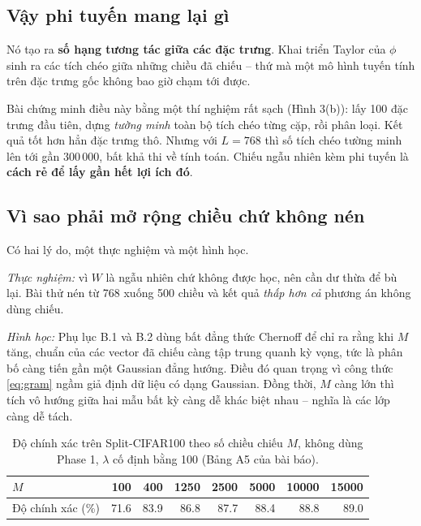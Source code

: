 \documentclass[11pt,a4paper]{article}
\begin{document}
\subsection{Vậy phi tuyến mang lại gì}

Nó tạo ra \textbf{số hạng tương tác giữa các đặc trưng}. Khai triển Taylor của
$\phi$ sinh ra các tích chéo giữa những chiều đã chiếu -- thứ mà một mô hình
tuyến tính trên đặc trưng gốc không bao giờ chạm tới được.

Bài chứng minh điều này bằng một thí nghiệm rất sạch (Hình 3(b)): lấy 100 đặc
trưng đầu tiên, dựng \emph{tường minh} toàn bộ tích chéo từng cặp, rồi phân loại.
Kết quả tốt hơn hẳn đặc trưng thô. Nhưng với $L = 768$ thì số tích chéo tường
minh lên tới gần $300\,000$, bất khả thi về tính toán. Chiếu ngẫu nhiên kèm phi
tuyến là \textbf{cách rẻ để lấy gần hết lợi ích đó}.

\subsection{Vì sao phải mở rộng chiều chứ không nén}

Có hai lý do, một thực nghiệm và một hình học.

\emph{Thực nghiệm:} vì $W$ là ngẫu nhiên chứ không được học, nên cần dư thừa để
bù lại. Bài thử nén từ 768 xuống 500 chiều và kết quả \emph{thấp hơn cả} phương
án không dùng chiếu.

\emph{Hình học:} Phụ lục B.1 và B.2 dùng bất đẳng thức Chernoff để chỉ ra rằng
khi $M$ tăng, chuẩn của các vector đã chiếu càng tập trung quanh kỳ vọng, tức là
phân bố càng tiến gần một Gaussian đẳng hướng. Điều đó quan trọng vì công thức
\eqref{eq:gram} ngầm giả định dữ liệu có dạng Gaussian. Đồng thời, $M$ càng lớn
thì tích vô hướng giữa hai mẫu bất kỳ càng dễ khác biệt nhau -- nghĩa là các lớp
càng dễ tách.

\begin{table}[htbp]
\centering
\caption{Độ chính xác trên Split-CIFAR100 theo số chiều chiếu $M$, không dùng
Phase 1, $\lambda$ cố định bằng 100 (Bảng A5 của bài báo).}
\label{tab:scale}
\begin{tabular}{lrrrrrrr}
\toprule
$M$ & 100 & 400 & 1250 & 2500 & 5000 & 10000 & 15000 \\
\midrule
Độ chính xác (\%) & 71.6 & 83.9 & 86.8 & 87.7 & 88.4 & 88.8 & 89.0 \\
\bottomrule
\end{tabular}
\end{table}
\end{document}
